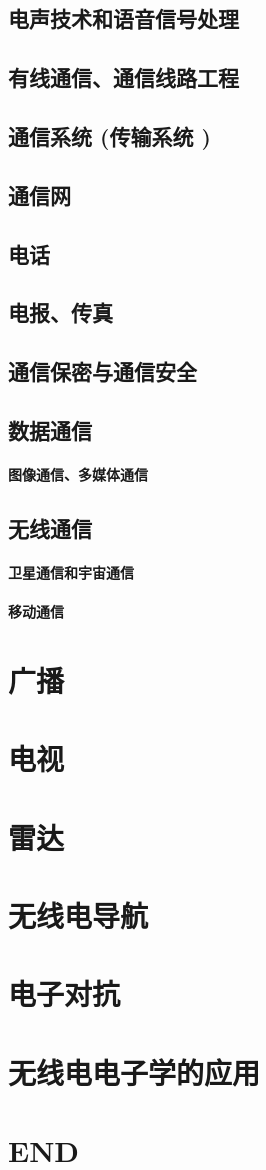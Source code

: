 \documentclass[UTF8]{../../ApplicationUniverse}
\begin{document}
\section{电声技术和语音信号处理}
\section{有线通信、通信线路工程}
\section{通信系统 (传输系统 )}
\section{通信网}
\section{电话}
\section{电报、传真}
\section{通信保密与通信安全}
\section{数据通信}
    \subsubsection{图像通信、多媒体通信}
\section{无线通信}
    \subsubsection{卫星通信和宇宙通信}
    \subsubsection{移动通信}
\chapter{广播}
\chapter{电视}
\chapter{雷达}
\chapter{无线电导航}
\chapter{电子对抗}
\chapter{无线电电子学的应用}




\chapter{END}
\end{document}
